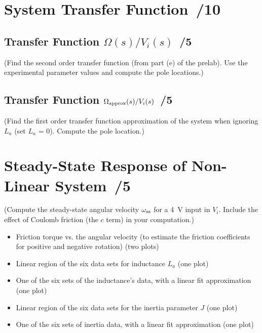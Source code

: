 \documentclass{article}
\newcommand{\score}{\hfill \underline{\hspace{0.65cm}}\,/} %
\begin{document}
\section{System Transfer Function \score 10}
\subsection{Transfer Function $\Omega(s)/V_i(s)$ \score 5}
(Find the second order transfer function (from part (e) of the prelab). Use the experimental parameter values and compute the pole locations.)

\subsection{Transfer Function $\Omega_{\rm approx}(s)/V_i(s)$ \score 5}
(Find the first order transfer function approximation of the system when ignoring $L_a$ (set $L_a$ = 0). Compute the pole location.)

\section{Steady-State Response of Non-Linear System \score 5}
(Compute the steady-state angular velocity $\omega_{\rm ss}$ for a \SI{4}{\volt} input in $V_i$. Include the effect of Coulomb friction (the $c$ term) in your computation.)
\newline \\[3mm]
\begin{itemize}
\item Friction torque vs. the angular velocity (to estimate the friction coefficients for positive and negative rotation) (two plots)
\item Linear region of the six data sets for inductance $L_a$ (one plot)
\item One of the six sets of the inductance's data, with a linear fit approximation (one plot)
\item Linear region of the six data sets for the inertia parameter $J$ (one plot)
\item One of the six sets of inertia data, with a linear fit approximation (one plot)
\end{itemize}
\end{document}
